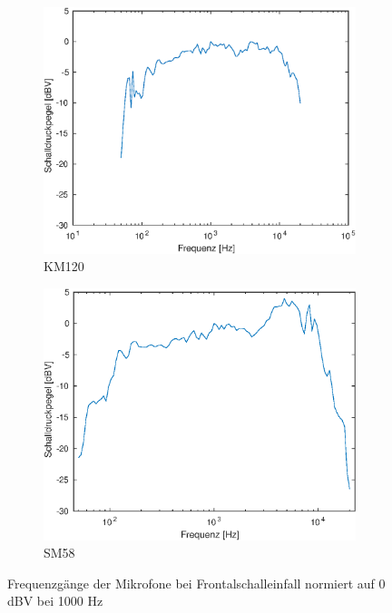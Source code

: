 \begin{figure}[b]
    \centering
    \begin{subfigure}{.5\textwidth}
        \centering
        \caption{KM120}
        \includegraphics[width=0.95\linewidth]{Figures/km120_0}
    \end{subfigure}%
    \begin{subfigure}{.5\textwidth}
        \centering
        \caption{SM58}
        \includegraphics[width=0.95\linewidth]{Figures/sm58_0}
    \end{subfigure}
    \caption{Frequenzgänge der Mikrofone bei Frontalschalleinfall normiert auf 0 dBV bei 1000 Hz}
    \label{fig:freq_0}
\end{figure}

